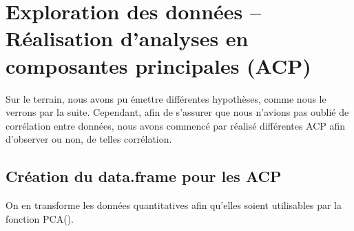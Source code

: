 \documentclass[
  french,
]{article}
\begin{document}
\newpage

\section{Exploration des données -- Réalisation d'analyses en
composantes principales
(ACP)}\label{exploration-des-donnuxe9es-ruxe9alisation-danalyses-en-composantes-principales-acp}

Sur le terrain, nous avons pu émettre différentes hypothèses, comme nous
le verrons par la suite. Cependant, afin de s'assurer que nous n'avions
pas oublié de corrélation entre données, nous avons commencé par réalisé
différentes ACP afin d'observer ou non, de telles corrélation.

\subsection{Création du data.frame pour les
ACP}\label{cruxe9ation-du-data.frame-pour-les-acp}

On en transforme les données quantitatives afin qu'elles soient
utilisables par la fonction PCA().
\end{document}
